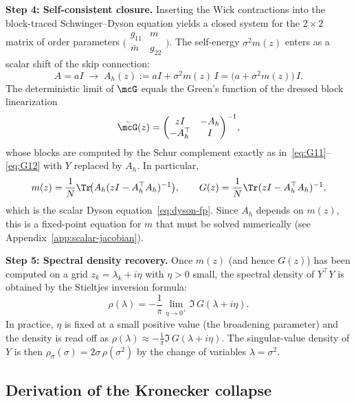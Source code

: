 \medskip
\noindent\textbf{Step 4: Self-consistent closure.}
Inserting the Wick contractions into the block-traced Schwinger--Dyson equation yields a closed system for the $2\times 2$ matrix of order parameters $\bigl(\begin{smallmatrix} g_{11} & m \\ \bar{m} & g_{22}\end{smallmatrix}\bigr)$. The self-energy $\sigma^2 m(z)$ enters as a scalar shift of the skip connection:
\begin{equation}\label{eq:dressed-skip}
A = aI \;\longrightarrow\; A_h(z) := aI + \sigma^2 m(z)\,I = \bigl(a + \sigma^2 m(z)\bigr)\,I.
\end{equation}
The deterministic limit of $\mcG$ equals the Green's function of the dressed block linearization
\[
\bar{\mcG}(z) = \begin{pmatrix} zI & -A_h \\ -A_h^\top & I \end{pmatrix}^{-1}\!,
\]
whose blocks are computed by the Schur complement exactly as in~\eqref{eq:G11}--\eqref{eq:G12} with $Y$ replaced by $A_h$. In particular,
\[
m(z) = \frac{1}{N}\Tr\!\bigl(A_h(zI - A_h^\top A_h)^{-1}\bigr), \qquad G(z) = \frac{1}{N}\Tr(zI - A_h^\top A_h)^{-1},
\]
which is the scalar Dyson equation~\eqref{eq:dyson-fp}. Since $A_h$ depends on $m(z)$, this is a fixed-point equation for $m$ that must be solved numerically (see Appendix~\ref{app:scalar-jacobian}).

\medskip
\noindent\textbf{Step 5: Spectral density recovery.}
Once $m(z)$ (and hence $G(z)$) has been computed on a grid $z_k = \lambda_k + i\eta$ with $\eta > 0$ small, the spectral density of $Y^\top Y$ is obtained by the Stieltjes inversion formula:
\begin{equation}\label{eq:stieltjes-inversion}
\rho(\lambda) = -\frac{1}{\pi}\lim_{\eta \to 0^+}\Im\, G(\lambda + i\eta).
\end{equation}
In practice, $\eta$ is fixed at a small positive value (the broadening parameter) and the density is read off as $\rho(\lambda) \approx -\frac{1}{\pi}\Im\, G(\lambda + i\eta)$. The singular-value density of $Y$ is then $\rho_\sigma(\sigma) = 2\sigma\,\rho(\sigma^2)$ by the change of variables $\lambda = \sigma^2$.

\subsection{Derivation of the Kronecker collapse}\label{app:kronecker-derivation}

